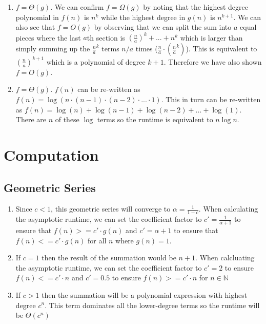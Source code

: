 \documentclass{article}
\begin{document}
\begin{enumerate}[label=(\alph*)]
    \item \(f = \Theta(g)\). We can confirm \(f = \Omega(g)\) by noting that the highest degree polynomial in \(f(n)\) is \(n^k\) while the highest degree in \(g(n)\) is \(n^{k+1}\). We can also see that \(f = O(g)\) by observing that we can split the sum into \(a\) equal pieces where the last \(a\)th section is  \((\frac{n}{a})^k + ... + n^k\) which is larger than simply summing up the \(\frac{n}{a}^k\) terms \(n/a\) times (\(\frac{n}{a}\cdot (\frac{n}{a}^k)\)). This is equivalent to \((\frac{n}{a})^{k+1}\) which is a polynomial of degree \(k + 1\). Therefore we have also shown \(f = O(g)\).
    
    \item \(f = \Theta(g)\). \(f(n)\) can be re-written as \(f(n) = \log(n \cdot (n-1) \cdot (n-2) \cdot ... \cdot 1)\). This in turn can be re-written as \(f(n) = \log(n) + \log(n-1) + \log(n-2) + ... + \log(1)\). There are \(n\) of these \(\log\) terms so the runtime is equivalent to \(n\log n\).
    
\end{enumerate}

\newpage

\section{Computation}
\subsection{Geometric Series}
\begin{enumerate}[label=(\alph*)]
    \item Since \(c < 1\), this geometric series will converge to \(\alpha = \frac{1}{1-c}\). When calculating the asymptotic runtime, we can set the coefficient factor to \(c' = \frac{1}{\alpha + 1}\) to ensure that \(f(n) >= c'\cdot g(n)\) and \(c' = \alpha + 1 \) to ensure that \(f(n) <= c'\cdot g(n)\) for all \(n\) where \(g(n) = 1\).
    
    \item If \(c=1\) then the result of the summation would be \(n + 1\). When calcluating the asymptotic runtime, we can set the coefficient factor to \(c' = 2\) to ensure \(f(n) <= c'\cdot n\) and \(c' = 0.5\) to ensure \(f(n) >= c'\cdot n\) for \(n \in \mathbb{N}\)
    
    \item If \(c > 1\) then the summation will be a polynomial expression with highest degree \(c^n\). This term dominates all the lower-degree terms so the runtime will be \(\Theta(c^n)\)
    
\end{enumerate}
\end{document}
